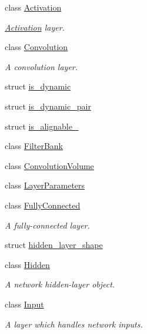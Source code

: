 \begin{DoxyCompactItemize}
\item 
class \hyperlink{classffnn_1_1layer_1_1_activation}{Activation}
\begin{DoxyCompactList}\small\item\em \hyperlink{classffnn_1_1layer_1_1_activation}{Activation} layer. \end{DoxyCompactList}\item 
class \hyperlink{classffnn_1_1layer_1_1_convolution}{Convolution}
\begin{DoxyCompactList}\small\item\em A convolution layer. \end{DoxyCompactList}\item 
struct \hyperlink{structffnn_1_1layer_1_1is__dynamic}{is\-\_\-dynamic}
\item 
struct \hyperlink{structffnn_1_1layer_1_1is__dynamic__pair}{is\-\_\-dynamic\-\_\-pair}
\item 
struct \hyperlink{structffnn_1_1layer_1_1is__alignable__128}{is\-\_\-alignable\-\_}
\item 
class \hyperlink{classffnn_1_1layer_1_1_filter_bank}{Filter\-Bank}
\item 
class \hyperlink{classffnn_1_1layer_1_1_convolution_volume}{Convolution\-Volume}
\item 
class \hyperlink{classffnn_1_1layer_1_1_layer_parameters}{Layer\-Parameters}
\item 
class \hyperlink{classffnn_1_1layer_1_1_fully_connected}{Fully\-Connected}
\begin{DoxyCompactList}\small\item\em A fully-\/connected layer. \end{DoxyCompactList}\item 
struct \hyperlink{structffnn_1_1layer_1_1hidden__layer__shape}{hidden\-\_\-layer\-\_\-shape}
\item 
class \hyperlink{classffnn_1_1layer_1_1_hidden}{Hidden}
\begin{DoxyCompactList}\small\item\em A network hidden-\/layer object. \end{DoxyCompactList}\item 
class \hyperlink{classffnn_1_1layer_1_1_input}{Input}
\begin{DoxyCompactList}\small\item\em A layer which handles network inputs. \end{DoxyCompactList}\item 

\end{DoxyCompactItemize}

